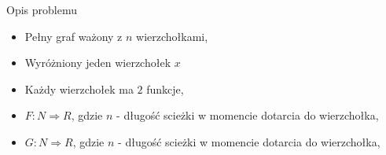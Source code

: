 \begin{block}{Opis problemu}
\begin{itemize}
\item Pełny graf ważony z $n$ wierzchołkami,
\pause
\item Wyróżniony jeden wierzchołek $x$
\pause
\item Każdy wierzchołek ma $2$ funkcje,
\pause
\item $F:N \Rightarrow R$, gdzie $n$ - długość scieżki w momencie dotarcia do wierzchołka,
\pause
\item  $G:N \Rightarrow R$, gdzie $n$ - długość scieżki w momencie dotarcia do wierzchołka,
\end{itemize}
\end{block}
